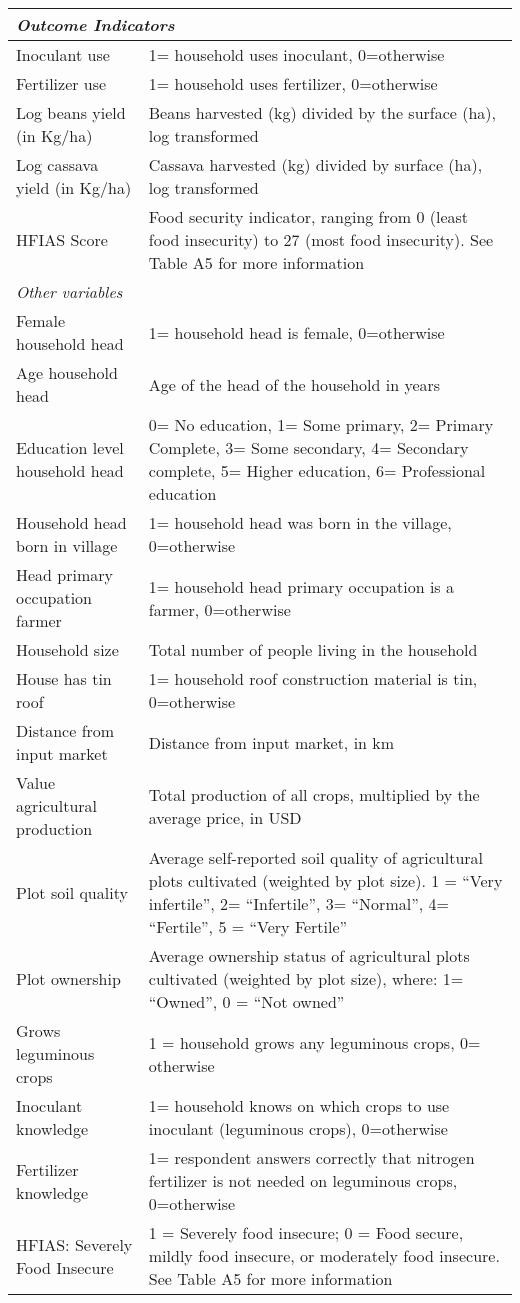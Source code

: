 \begin{table}[htbp]
\begin{tabular}{p{}p{}}
	\multicolumn{2}{l}{\textit{Outcome Indicators}}\\
	\midrule
	Inoculant use & 1= household uses inoculant, 0=otherwise\\
	Fertilizer use & 1= household uses fertilizer, 0=otherwise\\
	Log beans yield (in Kg/ha) & Beans harvested (kg) divided by the surface (ha), log transformed\\
	Log cassava yield (in Kg/ha) & Cassava harvested (kg) divided by surface (ha), log transformed\\
	HFIAS Score & Food security indicator, ranging from 0 (least food insecurity) to 27 (most food insecurity). See Table A5 for more information\\
	\multicolumn{2}{l}{\textit{Other variables}}\\
	\midrule
	Female household head & 1= household head is female, 0=otherwise\\
	Age household head  & Age of the head of the household in years \\
	Education level household head & 0= No education, 1= Some primary, 2= Primary Complete, 3= Some secondary, 4= Secondary complete, 5= Higher education, 6= Professional education\\
	Household head born in village & 1= household head was born in the village, 0=otherwise\\
	Head primary occupation farmer & 1= household head primary occupation is a farmer, 0=otherwise\\
	Household size & Total number of people living in the household\\
	House has tin roof & 1= household roof construction material is tin, 0=otherwise\\
	Distance from input market & Distance from input market, in km\\
	Value agricultural production & Total production of all crops, multiplied by the average price, in USD\\
	Plot soil quality  & Average self-reported soil quality of agricultural plots cultivated (weighted by plot size). 1 = “Very infertile”, 2= “Infertile”, 3= “Normal”, 4= “Fertile”, 5 = “Very Fertile”\\
	Plot ownership & Average ownership status of agricultural plots cultivated (weighted by plot size), where: 1= “Owned”, 0 = “Not owned”\\
	Grows leguminous crops & 1 = household grows any leguminous crops, 0= otherwise\\
	Inoculant knowledge  & 1= household knows on which crops to use inoculant (leguminous crops), 0=otherwise\\
	Fertilizer knowledge  & 1= respondent answers correctly that nitrogen fertilizer is not needed on leguminous crops, 0=otherwise\\
	HFIAS: Severely Food Insecure & 1 = Severely food insecure; 0 = Food secure, mildly food insecure, or moderately food insecure. See Table A5 for more information\\



\end{tabular}
\end{table}
